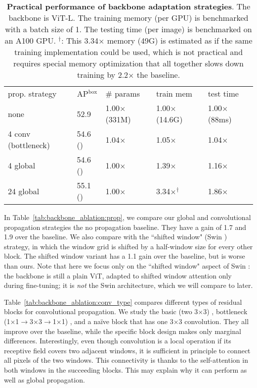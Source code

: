 \documentclass[runningheads]{llncs}
\newcommand{\res}[2]{{#1} {({\gain{#2}})}}
\begin{document}
\begin{table}[t]
    \begin{tabular}{@{}l|llll@{}}
        prop. strategy & \multicolumn{1}{c}{AP$^\text{box}$} & \# params & train mem & test time \\
        \shline
        none  &  52.9 & 1.00$\times$ {\scriptsize (331M)} & 1.00$\times$ {\scriptsize (14.6G)} & 1.00$\times$ {\scriptsize (88ms)} \\ 
        \hline  
        4 conv (bottleneck) & \res{54.6}{+1.7} & 1.04$\times$ & 1.05$\times$ & 1.04$\times$ \\
        4 global & \res{54.6}{+1.7} & 1.00$\times$ & 1.39$\times$ & 1.16$\times$ \\
        24 global & \res{55.1}{+2.2} & 1.00$\times$ & 3.34$\times$$^\dagger$ & 1.86$\times$ \\
    \end{tabular}
    \vspace{.5em}
    \caption{\textbf{Practical performance of backbone adaptation strategies}. The backbone is \mbox{ViT-L}. The training memory (per GPU) is benchmarked with a batch size of 1. The testing time (per image) is benchmarked on an A100 GPU. {$^\dagger$: This 3.34$\times$ memory (49G) is estimated as if the same training implementation could be used, which is not practical and requires special memory optimization that all together slows down training by 2.2$\times$ \vs the baseline.}
    \label{tab:complexity}
    }
\vspace{-1.5em}
\end{table}

In Table~\ref{tab:backbone_ablation:prop}, we compare our global and convolutional propagation strategies \vs the no propagation baseline. They have a gain of 1.7 and 1.9 over the baseline. We also compare with the ``shifted window" (Swin \cite{Liu2021}) strategy, in which the window grid is shifted by a half-window size for every other block. The shifted window variant has a 1.1 gain over the baseline, but is worse than ours.
Note that here we focus only on the ``shifted window" aspect of Swin \cite{Liu2021}: the backbone is still a plain ViT, adapted to shifted window attention only during fine-tuning; it is \textit{not} the Swin architecture, which we will compare to later.

Table~\ref{tab:backbone_ablation:conv_type} compares different types of residual blocks for convolutional propagation. We study the basic (two 3$\times$3) \cite{He2016}, bottleneck (1$\times$1$\rightarrow$3$\times$3$\rightarrow$1$\times$1) \cite{He2016}, and a na\"ive block that has one 3$\times$3 convolution. They all improve over the baseline, while the specific block design makes only marginal differences. Interestingly, even though convolution is a local operation if its receptive field covers two adjacent windows, it is sufficient in principle to connect all pixels of the two windows. This connectivity is thanks to the self-attention in both windows in the succeeding blocks. This may explain why it can perform as well as global propagation.
\end{document}
